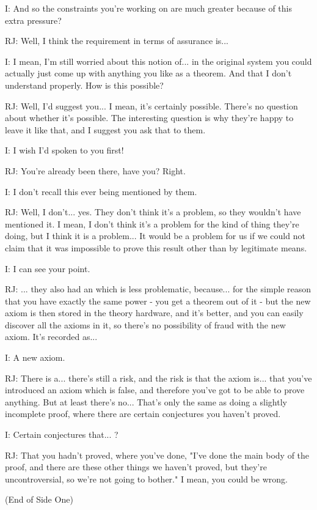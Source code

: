 \documentclass[10pt,titlepage]{book}
\begin{document}
I: And so the constraints you're working on are much greater because of this extra pressure?

RJ: Well, I think the requirement in terms of assurance is...

I: I mean, I'm still worried about this notion of... in the original system you could actually just come up with anything you like as a theorem. And that I don't understand properly. How is this possible?

RJ: Well, I'd suggest you... I mean, it's certainly possible. There's no question about whether it's possible. The interesting question is why they're happy to leave it like that, and I suggest you ask that to them.

I: I wish I'd spoken to you first!

RJ: You're already been there, have you? Right.

I: I don't recall this ever being mentioned by them.

RJ: Well, I don't... yes. They don't think it's a problem, so they wouldn't have mentioned it. I mean, I don't think it's a problem for the kind of thing they're doing, but I think it is a problem... It would be a problem for us if we could not claim that it was impossible to prove this result other than by legitimate means.

I: I can see your point.

RJ: 	... they also had an	which is less problematic, because... for the simple reason that you have exactly the same power - you get a theorem out of it - but the new axiom is then stored in the theory hardware, and it's better, and you can easily discover all the axioms in it, so there's no possibility of fraud with the new axiom. It's recorded as...

I: A new axiom.

RJ: There is a... there's still a risk, and the risk is that the axiom is... that you've introduced an axiom which is false, and therefore you've got to be able to prove anything. But at least there's no... That's only the same as doing a slightly incomplete proof, where there are certain conjectures you haven't proved.

I: Certain conjectures that... ?

RJ: That you hadn't proved, where you've done, "I've done the main body of the proof, and there are these other things we haven't proved, but they're uncontroversial, so we're not going to bother." I mean, you could be wrong.

(End of Side One)
\end{document}

